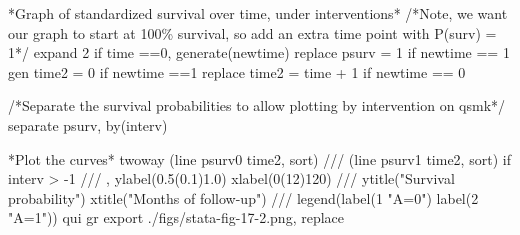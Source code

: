 \documentclass[
  10pt,
  a4paper,
]{book}
\newenvironment{Shaded}{\begin{snugshade}}{\end{snugshade}}
\newcommand{\BaseNTok}[1]{\textcolor[rgb]{0.68,0.00,0.00}{#1}}
\newcommand{\CommentTok}[1]{\textcolor[rgb]{0.37,0.37,0.37}{#1}}
\newcommand{\KeywordTok}[1]{\textcolor[rgb]{0.00,0.46,0.62}{#1}}
\newcommand{\NormalTok}[1]{\textcolor[rgb]{0.00,0.46,0.62}{#1}}
\newcommand{\StringTok}[1]{\textcolor[rgb]{0.13,0.47,0.30}{#1}}
\begin{document}
\begin{Shaded}
\begin{Highlighting}[]
\NormalTok{*Graph }\KeywordTok{of}\NormalTok{ standardized survival }\BaseNTok{over}\NormalTok{ time, under interventions*}
\CommentTok{/*Note, we want our graph to start at 100\% survival, }
\CommentTok{so add an extra time point with P(surv) = 1*/}
\NormalTok{expand 2 }\KeywordTok{if}\NormalTok{ time ==0, }\KeywordTok{generate}\NormalTok{(newtime)}
\KeywordTok{replace}\NormalTok{ psurv  = 1 }\KeywordTok{if}\NormalTok{ newtime == 1}
\KeywordTok{gen}\NormalTok{ time2 = 0 }\KeywordTok{if}\NormalTok{ newtime ==1}
\KeywordTok{replace}\NormalTok{ time2 = time + 1 }\KeywordTok{if}\NormalTok{ newtime == 0}

\CommentTok{/*Separate the survival probabilities to allow plotting by }
\CommentTok{intervention on qsmk*/}
\KeywordTok{separate}\NormalTok{ psurv, }\KeywordTok{by}\NormalTok{(interv)}

\NormalTok{*Plot the curves*}
\KeywordTok{twoway}\NormalTok{ (}\KeywordTok{line}\NormalTok{ psurv0 time2, }\KeywordTok{sort}\NormalTok{) }\CommentTok{///}
\NormalTok{  (}\KeywordTok{line}\NormalTok{ psurv1 time2, }\KeywordTok{sort}\NormalTok{) }\KeywordTok{if}\NormalTok{ interv \textgreater{} {-}1 }\CommentTok{///}
\NormalTok{  , }\KeywordTok{ylabel}\NormalTok{(0.5(0.1)1.0) }\KeywordTok{xlabel}\NormalTok{(0(12)120) }\CommentTok{///}
  \BaseNTok{ytitle}\NormalTok{(}\StringTok{"Survival probability"}\NormalTok{) }\BaseNTok{xtitle}\NormalTok{(}\StringTok{"Months of follow{-}up"}\NormalTok{) }\CommentTok{///}
  \BaseNTok{legend}\NormalTok{(}\KeywordTok{label}\NormalTok{(1 }\StringTok{"A=0"}\NormalTok{) }\KeywordTok{label}\NormalTok{(2 }\StringTok{"A=1"}\NormalTok{))}
\KeywordTok{qui} \KeywordTok{gr} \KeywordTok{export}\NormalTok{ ./figs/stata{-}fig{-}17{-}2.png, }\KeywordTok{replace}
\end{Highlighting}
\end{Shaded}
\end{document}
